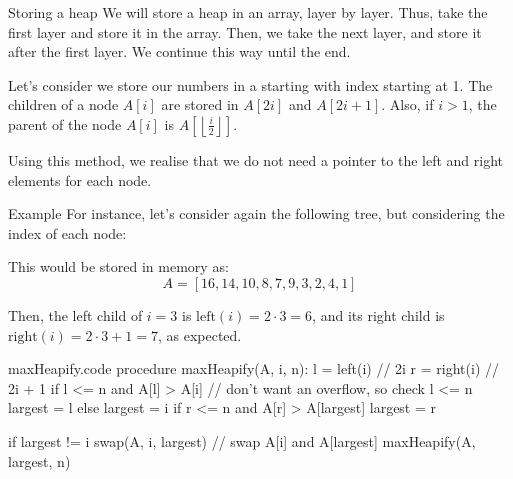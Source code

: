 \documentclass[a4paper]{article}
\begin{document}
\begin{parag}{Storing a heap}
    We will store a heap in an array, layer by layer. Thus, take the first layer and store it in the array. Then, we take the next layer, and store it after the first layer. We continue this way until the end.

    Let's consider we store our numbers in a starting with index starting at 1. The children of a node $A\left[i\right]$ are stored in $A\left[2i\right]$ and $A\left[2i + 1\right]$. Also, if $i > 1$, the parent of the node $A\left[i\right]$ is $A\left[\left\lfloor \frac{i}{2} \right\rfloor \right]$.

    Using this method, we realise that we do not need a pointer to the left and right elements for each node.

    \begin{subparag}{Example}
        For instance, let's consider again the following tree, but considering the index of each node:

        This would be stored in memory as: 
        \[A = \left[16, 14, 10, 8, 7, 9, 3, 2, 4, 1\right]\]
        
        Then, the left child of $i = 3$ is $\text{left}\left(i\right) = 2\cdot 3 = 6$, and its right child is $\text{right}\left(i\right) = 2\cdot 3 + 1 = 7$, as expected.
    \end{subparag}
\end{parag}

\begin{filecontents*}[overwrite]{maxHeapify.code}
procedure maxHeapify(A, i, n):
    l = left(i)  // 2i
    r = right(i)  // 2i + 1
    if l <= n and A[l] > A[i]  // don't want an overflow, so check l <= n
        largest = l
    else
        largest = i
    if r <= n and A[r] > A[largest]
        largest = r

    if largest != i
        swap(A, i, largest)  // swap A[i] and A[largest]
        maxHeapify(A, largest, n)
\end{filecontents*}
\end{document}
